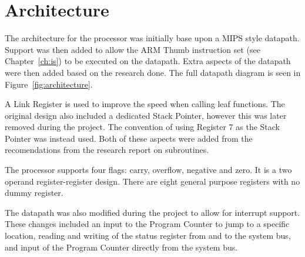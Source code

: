 

\chapter{Architecture}




The architecture for the processor was initially base upon a MIPS style datapath.
Support was then added to allow the ARM Thumb instruction set (see Chapter~\ref{ch:is}) to be executed on the datapath. 
Extra aspects of the datapath were then added based on the research done. 
The full datapath diagram is seen in Figure~\ref{fig:architecture}.

A Link Register is used to improve the speed when calling leaf functions.
The original design also included a dedicated Stack Pointer, however this was later removed during the project.
The convention of using Register 7 as the Stack Pointer was instead used. 
Both of these aspects were added from the recomendations from the research report on subroutines.

The processor supports four flags: carry, overflow, negative and zero. 
It is a two operand register-register design.
There are eight general purpose registers with no dummy register. 

The datapath was also modified during the project to allow for interrupt support.
These changes included an input to the Program Counter to jump to a specific location, reading and writing of the status register from and to the system bus, and input of the Program Counter directly from the system bus. 


